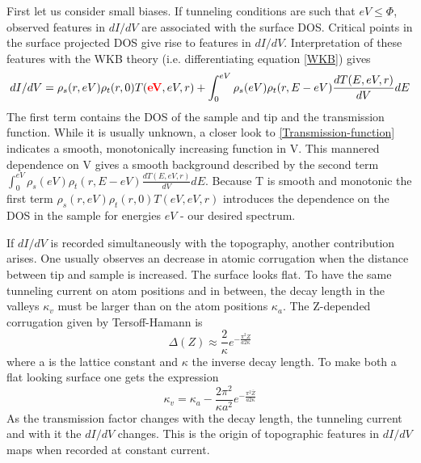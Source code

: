 First let us consider small biases.
If tunneling conditions are such that $eV\leq\Phi$, observed features in $dI/dV$ are associated with the surface DOS. Critical points in the surface projected DOS give rise to features in $dI/dV$. Interpretation of these features with the WKB theory (i.e. differentiating equation \eqref{WKB}) gives
$$dI/dV=\rho_s(r,eV)\rho_t(r,0)T(\textcolor{red}{\textbf{eV}},eV,r)+\int_0^{eV}\rho_s(eV)\rho_t(r,E-eV)\frac{dT(E,eV,r)}{dV}dE$$
The first term contains the DOS of the sample and tip and the transmission function. While it is usually unknown, a closer look to \eqref{Transmission-function} indicates a smooth, monotonically increasing function in V. This mannered dependence on V gives a smooth background described by the second term $\int_0^{eV}\rho_s(eV)\rho_t(r,E-eV)\frac{dT(E,eV,r)}{dV}dE$.
Because T is smooth and monotonic the first term $\rho_s(r,eV)\rho_t(r,0)T(eV,eV,r)$ introduces the dependence on the DOS in the sample for energies $eV$ - our desired spectrum.

If $dI/dV$ is recorded simultaneously with the topography, another contribution arises. One usually observes an decrease in atomic corrugation when the distance between tip and sample is increased. The surface looks flat. To have the same tunneling current on atom positions and in between, the decay length in the valleys $\kappa_v$ must be larger than on the atom positions $\kappa_a$. The Z-depended corrugation given by Tersoff-Hamann is $$\Delta(Z)\approx \frac{2}{\kappa}e^{-\frac{\pi^2Z}{a2\kappa}}$$ where a is the lattice constant and $\kappa$ the inverse decay length. To make both a flat looking surface one gets the expression
$$\kappa_v=\kappa_a-\frac{2\pi^2}{\kappa a^2}e^{-\frac{\pi^2\bar Z}{a2\kappa}}$$ 
As the transmission factor changes with the decay length, the tunneling current and with it the $dI/dV$ changes. This is the origin of topographic features in $dI/dV$ maps when recorded at constant current.


